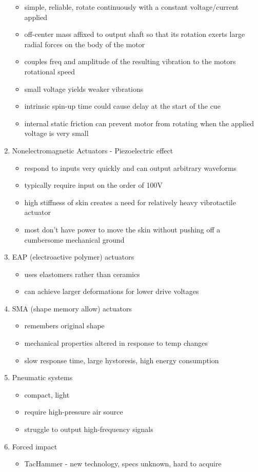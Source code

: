 \begin{enumerate}
\begin{itemize}
        \item simple, reliable, rotate continuously with a constant voltage/current applied
        \item off-center mass affixed to output shaft so that its rotation exerts large radial forces on the body of the motor
        \item couples freq and amplitude of the resulting vibration to the motors rotational speed
        \item small voltage yields weaker vibrations
        \item intrinsic spin-up time could cause delay at the start of the cue
        \item internal static friction can prevent motor from rotating when the applied voltage is very small
    \end{itemize}
    \item Nonelectromagnetic Actuators - Piezoelectric effect
    \begin{itemize}
        \item respond to inputs very quickly and can output arbitrary waveforms
        \item typically require input on the order of 100V
        \item high stiffness of skin creates a need for relatively heavy vibrotactile actuator
        \item most don't have power to move the skin without pushing off a cumbersome mechanical ground
    \end{itemize}
    \item EAP (electroactive polymer) actuators
    \begin{itemize}
        \item uses elastomers rather than ceramics
        \item can achieve larger deformations for lower drive voltages
    \end{itemize}
    \item SMA (shape memory allow) actuators
    \begin{itemize}
        \item remembers original shape
        \item mechanical properties altered in response to temp changes
        \item slow response time, large hystoresis, high energy consumption
    \end{itemize}
    \item Pneumatic systems
    \begin{itemize}
        \item compact, light
        \item require high-pressure air source
        \item struggle to output high-frequency signals
    \end{itemize}
    \item Forced impact
    \begin{itemize}
        \item TacHammer - new technology, specs unknown, hard to acquire
    \end{itemize}
\end{enumerate}

